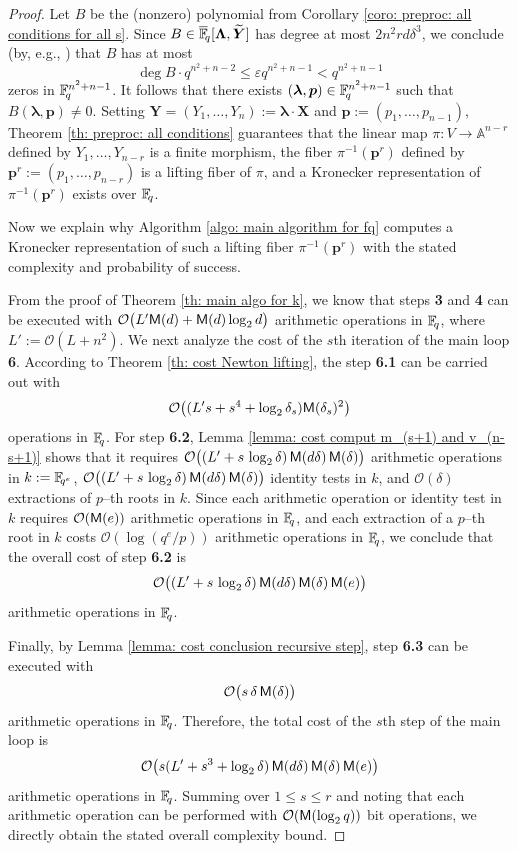 \documentclass[pdflatex,sn-basic]{sn-jnl}%
\theoremstyle{thmstyleone}%
\theoremstyle{thmstyletwo}%
\theoremstyle{thmstylethree}%
\theoremstyle{definition}
\numberwithin{equation}{section}
\newcommand{\bfs}{\boldsymbol}
\newcommand{\A}{\mathbb A}
\newcommand{\F}{\mathbb F}
\newcommand{\fq}{\F_{\hskip-0.7mm q}}
\newcommand{\fqe}{\F_{\hskip-0.7mm q^e}}
\newcommand{\cfq}{\overline{\F}_{\hskip-0.7mm q}}
\begin{document}
\begin{proof}
Let $B$ be the (nonzero) polynomial from Corollary
\ref{coro: preproc: all conditions for all s}. Since
$B\in\cfq[\bfs\Lambda,\widetilde{\bfs Y}]$ has degree at most
$2n^2rd\delta^3$, we conclude (by, e.g.,  \cite[Lemma 2.1]{CaMa06})
that $B$ has at most $$\deg B\cdot q^{n^2+n-2}\le \varepsilon
q^{n^2+n-1}<q^{n^2+n-1}$$ zeros in $\fq^{n^2+n-1}$. It follows that
there exists $(\bfs\lambda,\bfs p)\in\fq^{n^2+n-1}$ such that
$B(\bfs\lambda,\bfs p)\not=0$. Setting $\bfs Y=(Y_1,\ldots,Y_n):=
\bfs\lambda \cdot \bfs X$ and $\bfs p:=(p_1,\ldots,p_{n-1})$,
Theorem \ref{th: preproc: all conditions} guarantees that the linear
map $\pi:V\to\A^{n-r}$ defined by $Y_1,\ldots,Y_{n-r}$ is a finite
morphism, the fiber $\pi^{-1}(\bfs p^r)$ defined by $\bfs
p^r:=(p_1,\ldots,p_{n-r})$ is a lifting fiber of $\pi$, and
a Kronecker representation of $\pi^{-1}(\bfs p^r)$ exists over $\fq$.

Now we explain why Algorithm \ref{algo: main algorithm for fq}
computes a Kronecker representation of such a lifting fiber $\pi^{-1}(\bfs
p^r)$ with the stated complexity and probability of success.

From the proof of Theorem \ref{th: main algo for k}, we know that
steps {\bf 3} and {\bf 4} can be executed with
$\mathcal{O}\big(L'{\sf M}(d)+{\sf M}(d)\log_2 d\big)$ arithmetic
operations in $\fq$, where $L':=\mathcal{O}(L+n^2)$. We next analyze
the cost of the $s$th iteration of the main loop {\bf 6}. According to
Theorem \ref{th: cost Newton lifting}, the step {\bf 6.1} can be carried out with
%
$$\mathcal{O}\big((L's+s^4+\log_2\delta_s){\sf M}(\delta_s)^2\big)$$
%
operations in $\fq$. For step {\bf 6.2}, Lemma \ref{lemma: cost
comput m_(s+1) and v_(n-s+1)} shows that it requires
$\mathcal{O}\big((L'+s\,\log_2\delta)\,{\sf M}(d\delta)\,{\sf
M}(\delta) \big)$
%
arithmetic operations in $k:=\fqe$,
$\mathcal{O}\big((L'+s\,\log_2\delta)\,{\sf M}(d\delta)\,{\sf
M}(\delta)\big)$ identity tests in $k$, and $\mathcal{O}(\delta)$
extractions of $p$--th roots in $k$. Since each arithmetic operation or
identity test in $k$ requires $\mathcal{O}({\sf M}(e))$ arithmetic
operations in $\fq$, and each extraction of a $p$--th root in $k$
costs $\mathcal{O}(\log (q^e/p))$ arithmetic operations
in $\fq$, we conclude that the overall cost of step {\bf 6.2}
is $$\mathcal{O}\big((L'+s\,\log_2\delta)\,{\sf
M}(d\delta)\,{\sf M}(\delta)\,{\sf M}(e) \big)$$
%
arithmetic operations in $\fq$.

Finally, by Lemma \ref{lemma: cost conclusion recursive step},
step {\bf 6.3} can be executed with
%
$$\mathcal{O}\big(s\,\delta\,{\sf M}(\delta)\big)$$
%
arithmetic operations in $\fq$. Therefore, the total cost
of the $s$th step of the main loop is
%
$$\mathcal{O}\big(s(L'+s^3+\log_2\delta)\,{\sf M}(d\delta)\,{\sf
M}(\delta)\,{\sf M}(e)\big)
$$
%
arithmetic operations in $\fq$. Summing over $1\le s\le r$
and noting that each arithmetic operation can be
performed with $\mathcal{O}({\sf M}(\log_2q))$ bit operations, we
directly obtain the stated overall complexity bound.


\end{proof}
\end{document}
